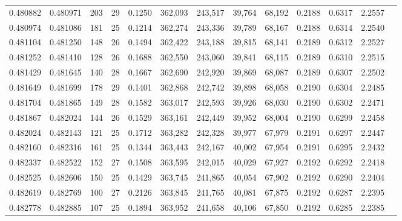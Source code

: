 \begin{tabular}{rrrrrrrrrrrrr}
0.480882 & 0.480971 &    203 &    29 &                                     0.1250 & 362,093 & 243,517 &  39,764 &  68,192 & 0.2188 & 0.6317 & 2.2557 \\
0.480974 & 0.481086 &    181 &    25 &                                     0.1214 & 362,274 & 243,336 &  39,789 &  68,167 & 0.2188 & 0.6314 & 2.2540 \\
0.481104 & 0.481250 &    148 &    26 &                                     0.1494 & 362,422 & 243,188 &  39,815 &  68,141 & 0.2189 & 0.6312 & 2.2527 \\
0.481252 & 0.481410 &    128 &    26 &                                     0.1688 & 362,550 & 243,060 &  39,841 &  68,115 & 0.2189 & 0.6310 & 2.2515 \\
0.481429 & 0.481645 &    140 &    28 &                                     0.1667 & 362,690 & 242,920 &  39,869 &  68,087 & 0.2189 & 0.6307 & 2.2502 \\
0.481649 & 0.481699 &    178 &    29 &                                     0.1401 & 362,868 & 242,742 &  39,898 &  68,058 & 0.2190 & 0.6304 & 2.2485 \\
0.481704 & 0.481865 &    149 &    28 &                                     0.1582 & 363,017 & 242,593 &  39,926 &  68,030 & 0.2190 & 0.6302 & 2.2471 \\
0.481867 & 0.482024 &    144 &    26 &                                     0.1529 & 363,161 & 242,449 &  39,952 &  68,004 & 0.2190 & 0.6299 & 2.2458 \\
0.482024 & 0.482143 &    121 &    25 &                                     0.1712 & 363,282 & 242,328 &  39,977 &  67,979 & 0.2191 & 0.6297 & 2.2447 \\
0.482160 & 0.482316 &    161 &    25 &                                     0.1344 & 363,443 & 242,167 &  40,002 &  67,954 & 0.2191 & 0.6295 & 2.2432 \\
0.482337 & 0.482522 &    152 &    27 &                                     0.1508 & 363,595 & 242,015 &  40,029 &  67,927 & 0.2192 & 0.6292 & 2.2418 \\
0.482525 & 0.482606 &    150 &    25 &                                     0.1429 & 363,745 & 241,865 &  40,054 &  67,902 & 0.2192 & 0.6290 & 2.2404 \\
0.482619 & 0.482769 &    100 &    27 &                                     0.2126 & 363,845 & 241,765 &  40,081 &  67,875 & 0.2192 & 0.6287 & 2.2395 \\
0.482778 & 0.482885 &    107 &    25 &                                     0.1894 & 363,952 & 241,658 &  40,106 &  67,850 & 0.2192 & 0.6285 & 2.2385 \\

\end{tabular}
